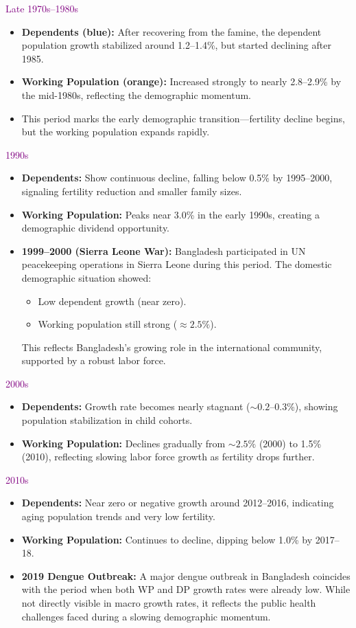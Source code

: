 \textcolor{purple}{Late 1970s--1980s}
\begin{itemize}[leftmargin=*]
    \item \textbf{Dependents (blue):} After recovering from the famine, the dependent population growth stabilized around 1.2--1.4\%, but started declining after 1985.
    \item \textbf{Working Population (orange):} Increased strongly to nearly 2.8--2.9\% by the mid-1980s, reflecting the demographic momentum.
    \item This period marks the early demographic transition---fertility decline begins, but the working population expands rapidly.
\end{itemize}

\textcolor{purple}{1990s}
\begin{itemize}[leftmargin=*]
    \item \textbf{Dependents:} Show continuous decline, falling below 0.5\% by 1995--2000, signaling fertility reduction and smaller family sizes.
    \item \textbf{Working Population:} Peaks near 3.0\% in the early 1990s, creating a demographic dividend opportunity.
    \item \textbf{1999--2000 (Sierra Leone War):} Bangladesh participated in UN peacekeeping operations in Sierra Leone during this period. The domestic demographic situation showed:
    \begin{itemize}
        \item Low dependent growth (near zero).
        \item Working population still strong ($\approx 2.5\%$).
    \end{itemize}
    This reflects Bangladesh’s growing role in the international community, supported by a robust labor force.
\end{itemize}

\textcolor{purple}{2000s}
\begin{itemize}[leftmargin=*]
    \item \textbf{Dependents:} Growth rate becomes nearly stagnant ($\sim 0.2$--0.3\%), showing population stabilization in child cohorts.
    \item \textbf{Working Population:} Declines gradually from $\sim 2.5\%$ (2000) to 1.5\% (2010), reflecting slowing labor force growth as fertility drops further.
\end{itemize}

\textcolor{purple}{2010s}
\begin{itemize}[leftmargin=*]
    \item \textbf{Dependents:} Near zero or negative growth around 2012--2016, indicating aging population trends and very low fertility.
    \item \textbf{Working Population:} Continues to decline, dipping below 1.0\% by 2017--18.
    \item \textbf{2019 Dengue Outbreak:} A major dengue outbreak in Bangladesh coincides with the period when both WP and DP growth rates were already low. While not directly visible in macro growth rates, it reflects the public health challenges faced during a slowing demographic momentum.
\end{itemize}

